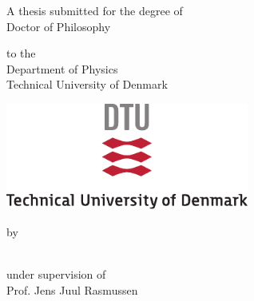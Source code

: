 \begin{titlepage}
    \pagestyle{empty}
    \begin{center}
        \vspace*{1cm}

        \Huge{\textbf{\thesisTitle}}

        \vspace{1.5cm}

        \large
        A thesis submitted for the degree of\\
        Doctor of Philosophy

        \vspace{0.8cm}
        to the\\
        Department of Physics\\
        Technical University of Denmark

        \vfill

        \includegraphics[width=0.6\textwidth]{fig/DTULogo}

        \vfill
        by\\
        \authorName\\
        \vspace{0.8cm}

        under supervision of\\
        Prof. Jens Juul Rasmussen\\

    \end{center}
    \clearpage
    \newpage
    \clearpage
    \thispagestyle{empty}
    \begin{center}
        \vspace*{1cm}

        \Huge{\textbf{\thesisTitle}}

        \vspace{1.5cm}
        \vfill


\end{center}
\end{titlepage}
